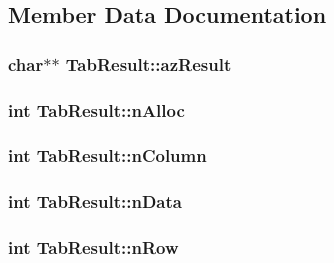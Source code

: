 \subsection{Member Data Documentation}
\hypertarget{struct_tab_result_a7446a22a7b39c17e447c65ba200490a6}{
\subsubsection[{az\-Result}]{\setlength{\rightskip}{0pt plus 5cm}char$\ast$$\ast$ Tab\-Result\-::az\-Result}}\label{struct_tab_result_a7446a22a7b39c17e447c65ba200490a6}
\hypertarget{struct_tab_result_a6a1d5bc64a1eeef54b56cb2602b663b2}{
\subsubsection[{n\-Alloc}]{\setlength{\rightskip}{0pt plus 5cm}int Tab\-Result\-::n\-Alloc}}\label{struct_tab_result_a6a1d5bc64a1eeef54b56cb2602b663b2}
\hypertarget{struct_tab_result_a44237b9ab33cdbca7a5a158470ebcaa3}{
\subsubsection[{n\-Column}]{\setlength{\rightskip}{0pt plus 5cm}int Tab\-Result\-::n\-Column}}\label{struct_tab_result_a44237b9ab33cdbca7a5a158470ebcaa3}
\hypertarget{struct_tab_result_a959e8dd3348f76e4cdabad9c89ee62d1}{
\subsubsection[{n\-Data}]{\setlength{\rightskip}{0pt plus 5cm}int Tab\-Result\-::n\-Data}}\label{struct_tab_result_a959e8dd3348f76e4cdabad9c89ee62d1}
\hypertarget{struct_tab_result_ae803d6f07364c9e03bee8abd13056e1b}{
\subsubsection[{n\-Row}]{\setlength{\rightskip}{0pt plus 5cm}int Tab\-Result\-::n\-Row}}\label{struct_tab_result_ae803d6f07364c9e03bee8abd13056e1b}
